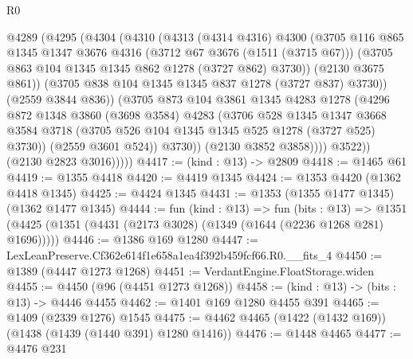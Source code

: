 \begin{lexlean}{R0}
\begin{coremodule}
                    @4289
                      (@4295
                        (@4304
                          (@4310
                            (@4313
                              (@4314 @4316)
                              @4300
                              (@3705
                                @116
                                @865
                                @1345
                                @1347
                                @3676
                                @4316
                                (@3712 @67 @3676 (@1511 (@3715 @67)))
                                (@3705 @863 @104 @1345 @1345 @862 @1278 (@3727 @862) @3730))
                              (@2130 @3675 @861))
                            (@3705 @838 @104 @1345 @1345 @837 @1278 (@3727 @837) @3730))
                          (@2559 @3844 @836))
                        (@3705
                          @873
                          @104
                          @3861
                          @1345
                          @4283
                          @1278
                          (@4296
                            @872
                            @1348
                            @3860
                            (@3698 @3584)
                            @4283
                            (@3706
                              @528
                              @1345
                              @1347
                              @3668
                              @3584
                              @3718
                              (@3705 @526 @104 @1345 @1345 @525 @1278 (@3727 @525) @3730))
                            (@2559 @3601 @524))
                          @3730))
                      (@2130 @3852 @3858))))
                @3522))
            (@2130 @2823 @3016)))))
@4417 := (kind : @13) -> @2809
@4418 := @1465 @61
@4419 := @1355 @4418
@4420 := @4419 @1345
@4424 := @1353 @4420 (@1362 @4418 @1345)
@4425 := @4424 @1345
@4431 := @1353 (@1355 @1477 @1345) (@1362 @1477 @1345)
@4444 := fun (kind : @13) =>
  fun (bits : @13) =>
  @1351 (@4425 (@1351 (@4431 (@2173 @3028) (@1349 (@1644 (@2236 @1268 @281) @1696)))))
@4446 := @1386 @169 @1280
@4447 := LexLeanPreserve.Cf362e614f1e658a1ea4f392b459fcf66.R0.__fits_4
@4450 := @1389 (@4447 @1273 @1268)
@4451 := VerdantEngine.FloatStorage.widen
@4455 := @4450 (@96 (@4451 @1273 @1268))
@4458 := (kind : @13) -> (bits : @13) -> @4446 @4455
@4462 := @1401 @169 @1280 @4455 @391
@4465 := @1409 (@2339 @1276) @1545
@4475 := @4462 @4465 (@1422 (@1432 @169)) (@1438 (@1439 (@1440 @391) @1280 @1416))
@4476 := @1448 @4465
@4477 := @4476 @231

\end{coremodule}
\end{lexlean}
